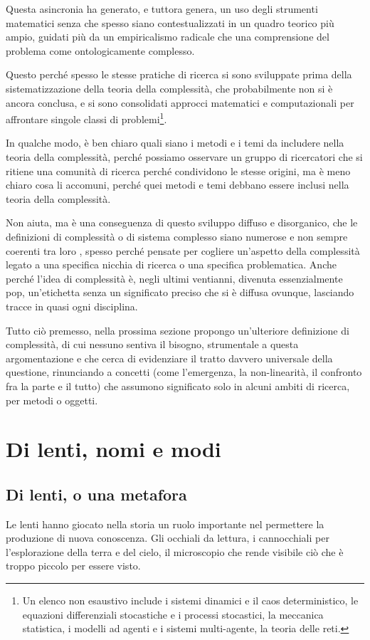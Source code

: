 \documentclass[a4paper, headings=standardclasses]{scrartcl}
\begin{document}
Questa asincronia ha generato, e tuttora genera, un uso degli strumenti matematici senza che spesso siano contestualizzati in un quadro teorico più ampio, guidati più da un empiricalismo radicale che una comprensione del problema come ontologicamente complesso.

Questo perché spesso le stesse pratiche di ricerca si sono sviluppate prima della sistematizzazione della teoria della complessità, che probabilmente non si è ancora conclusa, e si sono consolidati approcci matematici e computazionali per affrontare singole classi di problemi\footnote{Un elenco non esaustivo include i sistemi dinamici e il caos deterministico, le equazioni differenziali stocastiche e i processi stocastici, la meccanica statistica, i modelli ad agenti e i sistemi multi-agente, la teoria delle reti.}.

In qualche modo, è ben chiaro quali siano i metodi e i temi da includere nella teoria della complessità, perché possiamo osservare un gruppo di ricercatori che si ritiene una comunità di ricerca perché condividono le stesse origini, ma è meno chiaro cosa li accomuni, perché quei metodi e temi debbano essere inclusi nella teoria della complessità.

Non aiuta, ma è una conseguenza di questo sviluppo diffuso e disorganico, che le definizioni di complessità o di sistema complesso siano numerose e non sempre coerenti tra loro \parencite{holt2011}, spesso perché pensate per cogliere un'aspetto della complessità legato a una specifica nicchia di ricerca o una specifica problematica. Anche perché l'idea di complessità è, negli ultimi ventianni, divenuta essenzialmente pop, un'etichetta senza un significato preciso che si è diffusa ovunque, lasciando tracce in quasi ogni disciplina.

Tutto ciò premesso, nella prossima sezione propongo un'ulteriore definizione di complessità, di cui nessuno sentiva il bisogno, strumentale a questa argomentazione e che cerca di evidenziare il tratto davvero universale della questione, rinunciando a concetti (come l'emergenza, la non-linearità, il confronto fra la parte e il tutto) che assumono significato solo in alcuni ambiti di ricerca, per metodi o oggetti.

\section{Di lenti, nomi e modi}
\subsection{Di lenti, o una metafora}
Le lenti hanno giocato nella storia un ruolo importante nel permettere la produzione di nuova conoscenza. Gli occhiali da lettura, i cannocchiali per l'esplorazione della terra e del cielo, il microscopio che rende visibile ciò che è troppo piccolo per essere visto.
\end{document}
